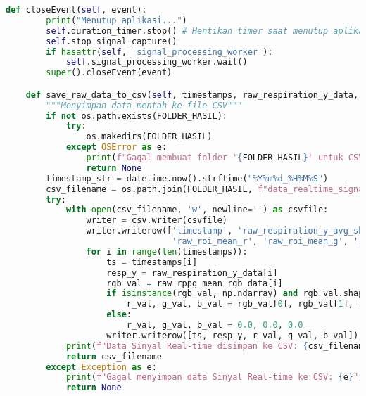 \documentclass[11pt,a4paper]{article}
\begin{document}
\begin{lstlisting}[language=Python, caption=Kelas RealTimeSignalWorker,label={labelkode}]
    def closeEvent(self, event):
        print("Menutup aplikasi...")
        self.duration_timer.stop() # Hentikan timer saat menutup aplikasi
        self.stop_signal_capture()
        if hasattr(self, 'signal_processing_worker'):
            self.signal_processing_worker.wait() 
        super().closeEvent(event)

    def save_raw_data_to_csv(self, timestamps, raw_respiration_y_data, raw_rppg_mean_rgb_data):
        """Menyimpan data mentah ke file CSV"""
        if not os.path.exists(FOLDER_HASIL):
            try:
                os.makedirs(FOLDER_HASIL)
            except OSError as e:
                print(f"Gagal membuat folder '{FOLDER_HASIL}' untuk CSV: {e}")
                return None
        timestamp_str = datetime.now().strftime("%Y%m%d_%H%M%S")
        csv_filename = os.path.join(FOLDER_HASIL, f"data_realtime_signal_{timestamp_str}.csv")
        try:
            with open(csv_filename, 'w', newline='') as csvfile:
                writer = csv.writer(csvfile)
                writer.writerow(['timestamp', 'raw_respiration_y_avg_shoulder', 
                                 'raw_roi_mean_r', 'raw_roi_mean_g', 'raw_roi_mean_b'])
                for i in range(len(timestamps)):
                    ts = timestamps[i]
                    resp_y = raw_respiration_y_data[i]
                    rgb_val = raw_rppg_mean_rgb_data[i]
                    if isinstance(rgb_val, np.ndarray) and rgb_val.shape == (3,):
                        r_val, g_val, b_val = rgb_val[0], rgb_val[1], rgb_val[2]
                    else: 
                        r_val, g_val, b_val = 0.0, 0.0, 0.0
                    writer.writerow([ts, resp_y, r_val, g_val, b_val])
            print(f"Data Sinyal Real-time disimpan ke CSV: {csv_filename}")
            return csv_filename
        except Exception as e:
            print(f"Gagal menyimpan data Sinyal Real-time ke CSV: {e}")
            return None


\end{lstlisting}
\end{document}
